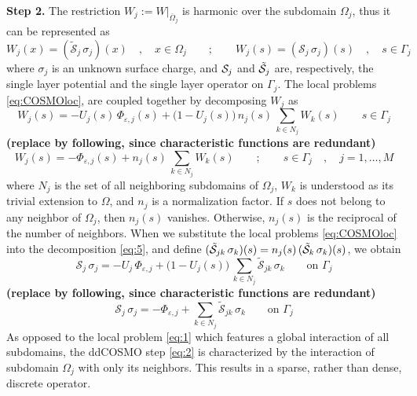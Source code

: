 {\bf Step 2.} The restriction $W_j := W |_{\overline{\Omega}_j}$ is harmonic over the subdomain $\Omega_j$, thus it can be represented as 
\begin{equation}\label{eq:COSMOloc}
W_j(x) = (\tilde{\mathcal{S}}_j \,  \sigma_j) (x) \quad , \quad x \in \Omega_j \qquad ; \qquad
W_j(s) = (\mathcal{S}_j \,  \sigma_j) (s) \quad , \quad s \in \Gamma_j
\end{equation}
where $\sigma_j$ is an unknown surface charge, and $\mathcal{S}_j$ and $\tilde{\mathcal{S}}_j$ are, respectively, the single layer potential and the single layer operator on $\Gamma_j$. The local problems \eqref{eq:COSMOloc}, are coupled together by decomposing $W_j$ as
\begin{equation}\label{eq:5}
W_j(s) = - U_j(s) \, \Phi_{\varepsilon,j}(s) +  \big (1 - U_j(s)\big ) \, n_j(s) \, \sum_{k \in N_j} {W}_k(s) \qquad s \in \Gamma_j
\end{equation}
{\bf (replace by following, since characteristic functions are redundant)}
\begin{equation}
W_j(s) = - \Phi_{\varepsilon,j}(s) +  n_j(s) \, \sum_{k \in N_j} {W}_k(s) \qquad ; \qquad s \in \Gamma_j \quad , \quad j = 1, \ldots , M
\end{equation}
where $N_j$ is the set of all neighboring subdomains of $\Omega_j$, $W_k$ is understood as its trivial extension to $\Omega$, and $n_j$ is a normalization factor. If $s$ does not belong to any neighbor of $\Omega_j$, then $n_j(s)$ vanishes. Otherwise, $n_j(s)$ is the reciprocal of the number of neighbors. When we substitute the local problems \eqref{eq:COSMOloc} into the decomposition \eqref{eq:5}, and define $(\tilde{\mathcal{S}}_{jk} \, \sigma_k) (s) = n_j(s) \, (\tilde{\mathcal{S}}_k \, \sigma_k)(s)$, we obtain
\begin{equation}\label{eq:2}
\mathcal{S}_j \, \sigma_j  = -U_j \, \Phi_{\varepsilon,j} + \big (1 - U_j(s)\big ) \, \sum_{k \in N_j} \tilde{\mathcal{S}}_{jk} \, \sigma_k \qquad \text{on } \Gamma_j
\end{equation}
{\bf (replace by following, since characteristic functions are redundant)}
\begin{equation}\label{eq:2}
\mathcal{S}_j \, \sigma_j  = - \Phi_{\varepsilon,j} +  \sum_{k \in N_j} \tilde{\mathcal{S}}_{jk} \, \sigma_k \qquad \text{on } \Gamma_j
\end{equation}
As opposed to the local problem \eqref{eq:1} which features a global interaction of all subdomains, the ddCOSMO step \eqref{eq:2} is characterized by the interaction of subdomain $\Omega_j$ with only its neighbors. This results in a sparse, rather than dense, discrete operator.

